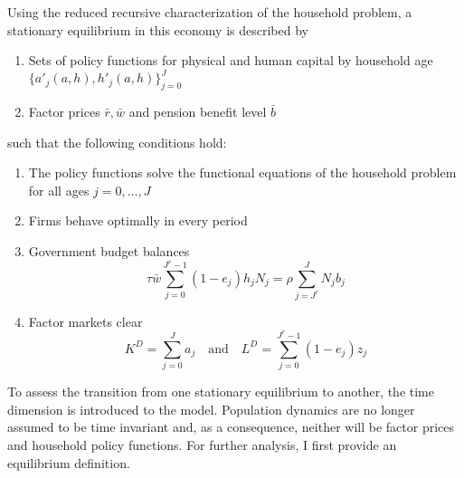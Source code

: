 Using the reduced recursive characterization of the household problem, a stationary equilibrium in this economy is described by
\begin{enumerate}
    \item Sets of policy functions for physical and human capital by household age $\{a'_{j}(a, h), h'_{j}(a, h) \}_{j=0}^{J}$
    \item Factor prices $\bar{r}, \bar{w}$ and pension benefit level $\bar{b}$
\end{enumerate}
such that the following conditions hold:
\begin{enumerate}
    \item The policy functions solve the functional equations of the household problem for all ages $j=0, \dots, J$
    \item Firms behave optimally in every period
    \item Government budget balances
        $$ \tau \bar{w} \sum_{j=0}^{J^r-1} (1 - e_j) h_{j} N_j = \rho \sum_{j=J^r}^J N_{j} b_{j} $$
    \item Factor markets clear
        $$ K^D = \sum_{j=0}^{J} a_j \quad\text{and}\quad L^D = \sum_{j=0}^{J^r-1} (1 - e_j) z_j $$
\end{enumerate}

To assess the transition from one stationary equilibrium to another, the time dimension is introduced to the model. Population dynamics are no longer assumed to be time invariant and, as a consequence, neither will be factor prices and household policy functions. For further analysis, I first provide an equilibrium definition.

